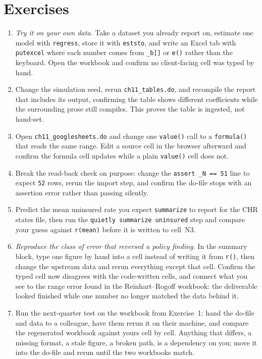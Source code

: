 \documentclass[
    a4paper,
    fontsize=10pt,
    twoside=true,
    numbers=noenddot,
]{kaobook}
\begin{document}
\section*{Exercises}
\begin{enumerate}
\item \emph{Try it on your own data.} Take a dataset you already report on, estimate one model with \texttt{regress}, store it with \texttt{eststo}, and write an Excel tab with \texttt{putexcel} where each number comes from \texttt{\_b[]} or \texttt{e()} rather than the keyboard. Open the workbook and confirm no client-facing cell was typed by hand.
\item Change the simulation seed, rerun \texttt{ch11\_tables.do}, and recompile the report that includes its output, confirming the table shows different coefficients while the surrounding prose still compiles. This proves the table is ingested, not hand-set.
\item Open \texttt{ch11\_googlesheets.do} and change one \texttt{value()} call to a \texttt{formula()} that reads the same range. Edit a source cell in the browser afterward and confirm the formula cell updates while a plain \texttt{value()} cell does not.
\item Break the read-back check on purpose: change the \texttt{assert \_N == 51} line to expect \texttt{52} rows, rerun the import step, and confirm the do-file stops with an assertion error rather than passing silently.
\item Predict the mean uninsured rate you expect \texttt{summarize} to report for the CHR states file, then run the \texttt{quietly summarize uninsured} step and compare your guess against \texttt{r(mean)} before it is written to cell~N3.
\item \emph{Reproduce the class of error that reversed a policy finding.} In the summary block, type one figure by hand into a cell instead of writing it from \texttt{r()}, then change the upstream data and rerun everything except that cell. Confirm the typed cell now disagrees with the code-written cells, and connect what you see to the range error \textcite{herndon2014debt} found in the Reinhart--Rogoff workbook: the deliverable looked finished while one number no longer matched the data behind it.
\item Run the next-quarter test on the workbook from Exercise~1: hand the do-file and data to a colleague, have them rerun it on their machine, and compare the regenerated workbook against yours cell by cell. Anything that differs, a missing format, a stale figure, a broken path, is a dependency on you; move it into the do-file and rerun until the two workbooks match.
\end{enumerate}
\end{document}
